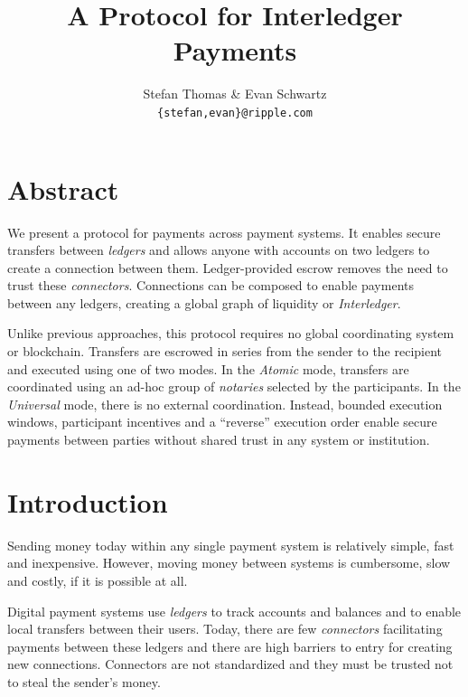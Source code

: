 \documentclass[letterpaper,twocolumn,10pt]{article}
\begin{document}
\title{\Large \bf A Protocol for Interledger Payments}

\author{
\textnormal{Stefan Thomas \& Evan Schwartz} \\
\textnormal{\texttt{\{stefan,evan\}@ripple.com}}
}

\maketitle

\thispagestyle{empty}
\section*{Abstract}

We present a protocol for payments across payment systems. It enables secure transfers between \textit{ledgers} and allows anyone with accounts on two ledgers to create a connection between them. Ledger-provided escrow removes the need to trust these \textit{connectors}. Connections can be composed to enable payments between any ledgers, creating a global graph of liquidity or \mbox{\textit{Interledger}}.

Unlike previous approaches, this protocol requires no global coordinating system or blockchain. Transfers are escrowed in series from the sender to the recipient and executed using one of two modes. In the \textit{Atomic} mode, transfers are coordinated using an ad-hoc group of \textit{notaries} selected by the participants. In the \textit{Universal} mode, there is no external coordination. Instead, bounded execution windows, participant incentives and a \mbox{``reverse''} execution order enable secure payments between parties without shared trust in any system or institution.


\section{Introduction}

Sending money today within any single payment system is relatively simple, fast and inexpensive. However, moving money between systems is cumbersome, slow and costly, if it is possible at all. 

Digital payment systems use \textit{ledgers} to track accounts and balances and to enable local transfers between their users. Today, there are few \textit{connectors} facilitating payments between these ledgers and there are high barriers to entry for creating new connections. Connectors are not standardized and they must be trusted not to steal the sender's money.
\end{document}
